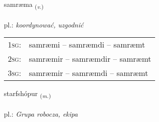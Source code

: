 \documentclass[frontgrid, backgrid]{flacards}\usepackage[]{graphicx}\usepackage[]{xcolor}
\begin{document}
\renewcommand{\flhead}{\vskip5pt \fboxsep=0pt {\small\bfseries\footnotesize Sagnorð | Verb}}
\renewcommand{\fcfoot}{\vskip5pt \fboxsep=0pt \hspace{2pt}{\small\bfseries\footnotesize 2K}}

\renewcommand{\blhead}{\vskip5pt {\small\bfseries\footnotesize Sagnorð | Verb }}
\renewcommand{\bcfoot}{\vskip5pt \hspace{2pt}{\small\bfseries\footnotesize 2K}}


{samræma \small{\textsubscript{(\textit{v.})}} \\[1ex] %
\textphonetic{[samraima]} \\
pl.: \emph{koordynować, uzgodnić} \\  [2ex]
\renewcommand*{\arraystretch}{0.8}
\begin{tabular}{p{1cm}l}
\textsc{1sg}: & samræmi -- samræmdi -- samræmt \\ 
\textsc{2sg}: & samræmir -- samræmdir -- samræmt \\ 
\textsc{3sg}: & samræmir -- samræmdi -- samræmt \\ 
\end{tabular}
}

\renewcommand{\flhead}{\vskip5pt \fboxsep=0pt {\small\bfseries\footnotesize Nafnorð | Noun}}
\renewcommand{\fcfoot}{\vskip5pt \fboxsep=0pt \hspace{2pt}{\small\bfseries\footnotesize 2K}}

\renewcommand{\blhead}{\vskip5pt {\small\bfseries\footnotesize Nafnorð | Noun }}
\renewcommand{\bcfoot}{\vskip5pt \hspace{2pt}{\small\bfseries\footnotesize 2K}}


{starfshópur \small{\textsubscript{(\textit{m.})}} \\[1ex] %
\textphonetic{[starfshoupʏr]} \\
pl.: \emph{Grupa robocza, ekipa} \\  [2ex]
\renewcommand*{\arraystretch}{0.8}
}
\end{document}
